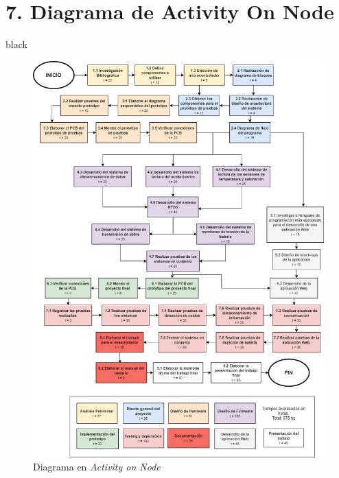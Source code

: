 \documentclass[11pt]{charter}
\begin{document}
\vspace{15px}
\section{7. Diagrama de Activity On Node}
\label{sec:AoN}

\begin{consigna}{black} 



\begin{figure}[htpb]
\centering 
\includegraphics[width=1\textwidth]{./Figuras/AoN.png}
\caption{Diagrama en \textit{Activity on Node}}
\label{fig:AoN}
\end{figure}

\end{consigna}
\end{document}
